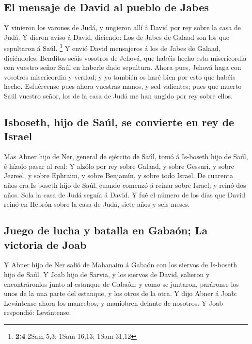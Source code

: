 \hypertarget{el-mensaje-de-david-al-pueblo-de-jabes}{%
\subsection{El mensaje de David al pueblo de
Jabes}\label{el-mensaje-de-david-al-pueblo-de-jabes}}

 Y vinieron los varones de Judá, y ungieron allí á David
por rey sobre la casa de Judá. Y dieron aviso á David, diciendo: Los de
Jabes de Galaad son los que sepultaron á Saúl. \footnote{\textbf{2:4}
  2Sam 5,3; 1Sam 16,13; 1Sam 31,12}  Y envió David
mensajeros á los de Jabes de Galaad, diciéndoles: Benditos seáis
vosotros de Jehová, que habéis hecho esta misericordia con vuestro señor
Saúl en haberle dado sepultura.  Ahora pues, Jehová haga
con vosotros misericordia y verdad; y yo también os haré bien por esto
que habéis hecho.  Esfuércense pues ahora vuestras manos,
y sed valientes; pues que muerto Saúl vuestro señor, los de la casa de
Judá me han ungido por rey sobre ellos.

\hypertarget{isboseth-hijo-de-sauxfal-se-convierte-en-rey-de-israel}{%
\subsection{Isboseth, hijo de Saúl, se convierte en rey de
Israel}\label{isboseth-hijo-de-sauxfal-se-convierte-en-rey-de-israel}}

 Mas Abner hijo de Ner, general de ejército de Saúl, tomó
á Is-boseth hijo de Saúl, é hízolo pasar al real:  Y
alzólo por rey sobre Galaad, y sobre Gessuri, y sobre Jezreel, y sobre
Ephraim, y sobre Benjamín, y sobre todo Israel.  De
cuarenta años era Is-boseth hijo de Saúl, cuando comenzó á reinar sobre
Israel; y reinó dos años. Sola la casa de Judá seguía á David.
 Y fué el número de los días que David reinó en Hebrón
sobre la casa de Judá, siete años y seis meses.

\hypertarget{juego-de-lucha-y-batalla-en-gabauxf3n-la-victoria-de-joab}{%
\subsection{Juego de lucha y batalla en Gabaón; La victoria de
Joab}\label{juego-de-lucha-y-batalla-en-gabauxf3n-la-victoria-de-joab}}

 Y Abner hijo de Ner salió de Mahanaim á Gabaón con los
siervos de Is-boseth hijo de Saúl.  Y Joab hijo de
Sarvia, y los siervos de David, salieron y encontráronlos junto al
estanque de Gabaón: y como se juntaron, paráronse los unos de la una
parte del estanque, y los otros de la otra.  Y dijo Abner
á Joab: Levántense ahora los mancebos, y maniobren delante de nosotros.
Y Joab respondió: Levántense.

